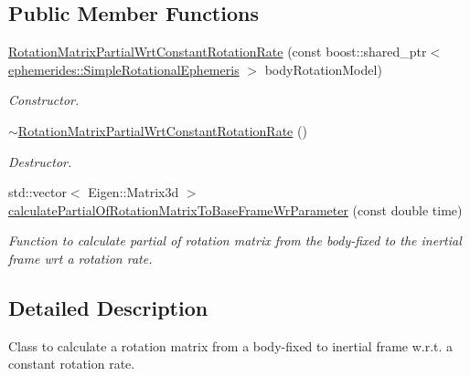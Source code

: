 \subsection*{Public Member Functions}
\begin{DoxyCompactItemize}
\item 
\hyperlink{classtudat_1_1observation__partials_1_1RotationMatrixPartialWrtConstantRotationRate_a7779b49ff2446f533a0ea654fb0341a1}{Rotation\+Matrix\+Partial\+Wrt\+Constant\+Rotation\+Rate} (const boost\+::shared\+\_\+ptr$<$ \hyperlink{classtudat_1_1ephemerides_1_1SimpleRotationalEphemeris}{ephemerides\+::\+Simple\+Rotational\+Ephemeris} $>$ body\+Rotation\+Model)
\begin{DoxyCompactList}\small\item\em Constructor. \end{DoxyCompactList}\item 
\hyperlink{classtudat_1_1observation__partials_1_1RotationMatrixPartialWrtConstantRotationRate_ab726f050920eed1aac62134722b337c5}{$\sim$\+Rotation\+Matrix\+Partial\+Wrt\+Constant\+Rotation\+Rate} ()\hypertarget{classtudat_1_1observation__partials_1_1RotationMatrixPartialWrtConstantRotationRate_ab726f050920eed1aac62134722b337c5}{}\label{classtudat_1_1observation__partials_1_1RotationMatrixPartialWrtConstantRotationRate_ab726f050920eed1aac62134722b337c5}

\begin{DoxyCompactList}\small\item\em Destructor. \end{DoxyCompactList}\item 
std\+::vector$<$ Eigen\+::\+Matrix3d $>$ \hyperlink{classtudat_1_1observation__partials_1_1RotationMatrixPartialWrtConstantRotationRate_af7cfb6213d9fd66a0db3851082ac57e9}{calculate\+Partial\+Of\+Rotation\+Matrix\+To\+Base\+Frame\+Wr\+Parameter} (const double time)
\begin{DoxyCompactList}\small\item\em Function to calculate partial of rotation matrix from the body-\/fixed to the inertial frame wrt a rotation rate. \end{DoxyCompactList}\end{DoxyCompactItemize}


\subsection{Detailed Description}
Class to calculate a rotation matrix from a body-\/fixed to inertial frame w.\+r.\+t. a constant rotation rate. 

